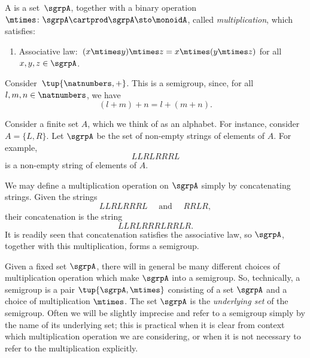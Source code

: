 
\section{}\label{sec:semigroups}


\begin{definition}[Semigroup]
  \label{def:semigroup}
  A \emph{} is a set~$\sgrpA$, together with a binary operation~$\mtimes \colon \sgrpA \cartprod \sgrpA \sto \monoidA$, called \emph{multiplication}, which satisfies:
  \begin{enumerate}
    \item Associative law:~$(x\mtimes y)\mtimes z=x\mtimes (y\mtimes z)$ for all $x , y, z \in \sgrpA$. 
  \end{enumerate}
\end{definition}

\begin{example}\label{natnum-semigroup}
  Consider~$\tup{\natnumbers,+}$. This is a semigroup, since, for all~$l,m, n \in \natnumbers$, we have
  \begin{equation*}
  (l+m)
    +n=l+(m+n).
  \end{equation*}
\end{example}

\begin{example}\label{string-semigroup}
Consider a finite set $A$, which we think of as an alphabet. For instance, consider $A = \{ L, R \}$. 
Let $\sgrpA$ be the set of non-empty strings of elements of $A$. For example, 
$$ LLRLRRRL $$ 
is a non-empty string of elements of $A$. 

We may define a multiplication operation on $\sgrpA$ simply by concatenating strings. Given the strings
$$ LLRLRRRL  \quad \text{ and } \quad RRLR, $$ 
their concatenation is the string
$$ LLRLRRRLRRLR.$$
It is readily seen that concatenation satisfies the associative law, so $\sgrpA$, together with this multiplication, forms a semigroup. 
\end{example}



\begin{remark}
Given a fixed set $\sgrpA$, there will in general be many different choices of multiplication operation which make $\sgrpA$ into a semigroup. So, technically, a semigroup is a pair $\tup{\sgrpA, \mtimes}$ consisting of a set $\sgrpA$ and a choice of multiplication $\mtimes$. The set $\sgrpA$ is the \emph{underlying set} of the semigroup. Often we will be slightly imprecise and refer to a semigroup simply by the name of its underlying set; this is practical when it is clear from context which multiplication operation we are considering, or when it is not necessary to refer to the multiplication explicitly. 
\end{remark}

